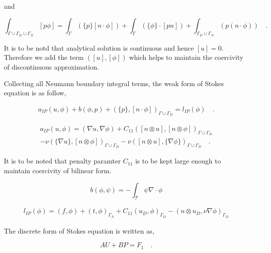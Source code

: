\documentclass[a4paper]{book}
\begin{document}
and 

\begin{equation}
\int_{\Gamma \cup \Gamma_D \cup \Gamma_N} [p \phi] = \int_{\Gamma} (\lbrace p \rbrace [ n \cdot \phi]) + \int_{\Gamma} (\lbrace \phi \rbrace \cdot [pn]) + \int_{\Gamma_D \cup \Gamma_N} (p (n \cdot \phi) ) \quad \textrm{.}
\end{equation}

It is to be notd that analytical solution is continuous and hence $[u] = 0$. Therefore we add the term $([u],[\phi])$ which helps to maintain the coercivity of discontinuous approximation.


Collecting all Neumann boundary integral terms, the weak form of Stokes equation is as follow,

\begin{equation}\label{stokes_weak_ch3}
\begin{split}
a_{IP}(u,\phi) + b(\phi,p) + (\{p\},[n\cdot \phi])_{\Gamma \cup \Gamma_D} = l_{IP}(\phi) \quad \textrm{.}
\end{split}
\end{equation}

\begin{equation}
\begin{split}
a_{IP}(u,\phi) = (\nabla u, \nabla \phi) + C_{11} ([n \otimes u],[n \otimes \phi])_{\Gamma \cup \Gamma_D} \\
- \nu (\{\nabla u\},[n \otimes \phi])_{\Gamma \cup \Gamma_D} - \nu ([n \otimes u],\{\nabla \phi\})_{\Gamma \cup \Gamma_D} \quad \textrm{.}
\end{split}
\end{equation}

It is to be noted that penalty paramter $C_{11}$ is to be kept large enough to maintain coercivity of bilinear form.

\begin{equation}
b(\phi,\psi) = -\int_{\mathcal{T}} \psi \nabla \cdot \phi
\end{equation}

\begin{equation}
\begin{split}
l_{IP}(\phi) = (f,\phi) + (t,\phi)_{\Gamma_N} + C_{11} (u_D,\phi)_{\Gamma_D} - (n \otimes u_D, \nu \nabla \phi)_{\Gamma_D}
\end{split}
\end{equation}

The discrete form of Stokes equation is written as,

\begin{equation} \label{stokes discrete_ch3}
AU + BP = F_1 \quad \textrm{.}
\end{equation}
\end{document}
